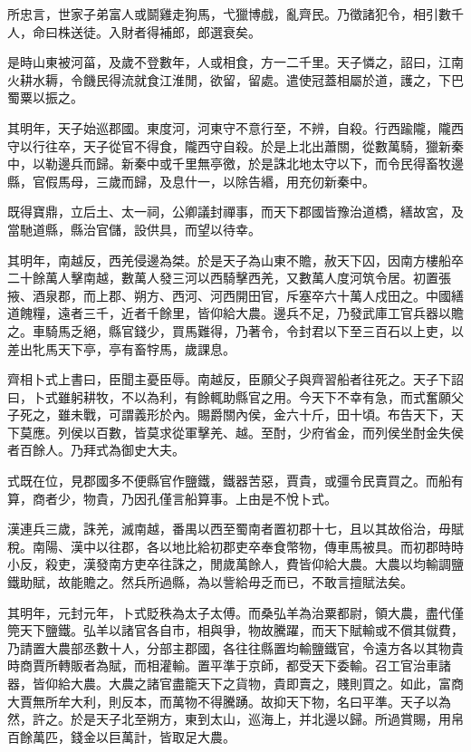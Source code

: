 所忠言，世家子弟富人或鬬雞走狗馬，弋獵博戲，亂齊民。乃徵諸犯令，相引數千人，命曰株送徒。入財者得補郎，郎選衰矣。

是時山東被河菑，及歲不登數年，人或相食，方一二千里。天子憐之，詔曰，江南火耕水耨，令饑民得流就食江淮閒，欲留，留處。遣使冠蓋相屬於道，護之，下巴蜀粟以振之。

其明年，天子始巡郡國。東度河，河東守不意行至，不辨，自殺。行西踰隴，隴西守以行往卒，天子從官不得食，隴西守自殺。於是上北出蕭關，從數萬騎，獵新秦中，以勒邊兵而歸。新秦中或千里無亭徼，於是誅北地太守以下，而令民得畜牧邊縣，官假馬母，三歲而歸，及息什一，以除告緡，用充仞新秦中。

既得寶鼎，立后土、太一祠，公卿議封禪事，而天下郡國皆豫治道橋，繕故宮，及當馳道縣，縣治官儲，設供具，而望以待幸。

其明年，南越反，西羌侵邊為桀。於是天子為山東不贍，赦天下囚，因南方樓船卒二十餘萬人擊南越，數萬人發三河以西騎擊西羌，又數萬人度河筑令居。初置張掖、酒泉郡，而上郡、朔方、西河、河西開田官，斥塞卒六十萬人戍田之。中國繕道餽糧，遠者三千，近者千餘里，皆仰給大農。邊兵不足，乃發武庫工官兵器以贍之。車騎馬乏絕，縣官錢少，買馬難得，乃著令，令封君以下至三百石以上吏，以差出牝馬天下亭，亭有畜牸馬，歲課息。

齊相卜式上書曰，臣聞主憂臣辱。南越反，臣願父子與齊習船者往死之。天子下詔曰，卜式雖躬耕牧，不以為利，有餘輒助縣官之用。今天下不幸有急，而式奮願父子死之，雖未戰，可謂義形於內。賜爵關內侯，金六十斤，田十頃。布告天下，天下莫應。列侯以百數，皆莫求從軍擊羌、越。至酎，少府省金，而列侯坐酎金失侯者百餘人。乃拜式為御史大夫。

式既在位，見郡國多不便縣官作鹽鐵，鐵器苦惡，賈貴，或彊令民賣買之。而船有算，商者少，物貴，乃因孔僅言船算事。上由是不悅卜式。

漢連兵三歲，誅羌，滅南越，番禺以西至蜀南者置初郡十七，且以其故俗治，毋賦稅。南陽、漢中以往郡，各以地比給初郡吏卒奉食幣物，傳車馬被具。而初郡時時小反，殺吏，漢發南方吏卒往誅之，閒歲萬餘人，費皆仰給大農。大農以均輸調鹽鐵助賦，故能贍之。然兵所過縣，為以訾給毋乏而已，不敢言擅賦法矣。

其明年，元封元年，卜式貶秩為太子太傅。而桑弘羊為治粟都尉，領大農，盡代僅筦天下鹽鐵。弘羊以諸官各自市，相與爭，物故騰躍，而天下賦輸或不償其僦費，乃請置大農部丞數十人，分部主郡國，各往往縣置均輸鹽鐵官，令遠方各以其物貴時商賈所轉販者為賦，而相灌輸。置平準于京師，都受天下委輸。召工官治車諸器，皆仰給大農。大農之諸官盡籠天下之貨物，貴即賣之，賤則買之。如此，富商大賈無所牟大利，則反本，而萬物不得騰踴。故抑天下物，名曰平準。天子以為然，許之。於是天子北至朔方，東到太山，巡海上，并北邊以歸。所過賞賜，用帛百餘萬匹，錢金以巨萬計，皆取足大農。

